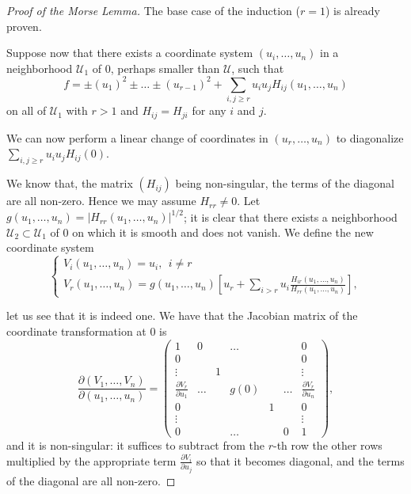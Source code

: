 \begin{proof}[Proof of the Morse Lemma]
    The base case of the induction ($r=1$) is already proven.

    Suppose now that there exists a coordinate system $(u_i,\dots,u_n)$ in a neighborhood $\mathcal{U}_1$ of $0$, perhaps smaller than $\mathcal{U}$, such that %
    \begin{equation}
        f = \pm (u_1)^2 \pm\dots\pm (u_{r-1})^2 + \sum_{i,j\ge r} u_i u_j H_{ij}(u_1,\dots,u_n)
    \label{eq1}
    \end{equation}
    on all of $\mathcal{U}_1$ with $r > 1$ and $H_{ij}=H_{ji}$ for any $i$ and $j$.

    We can now perform a linear change of coordinates in $(u_r,\dots, u_n)$ to diagonalize $\sum_{i,j\ge r} u_i u_j H_{ij}(0)$.

    We know that, the matrix $(H_{ij})$ being non-singular, the terms of the diagonal are all non-zero. Hence we may assume $H_{rr}\neq 0$. Let $g(u_1,\dots,u_n)=|H_{rr}(u_1,\dots,u_n)|^{1/2}$; it is clear that there exists a neighborhood $\mathcal{U}_2\subset \mathcal{U}_1$ of $0$ on which it is smooth and does not vanish. We define the new coordinate system
    \begin{equation}
        \begin{cases}
            V_i(u_1,\dots,u_n) = u_i,~~i\neq r\\
            V_r(u_1,\dots,u_n)=g(u_1,\dots,u_n)\left[u_r+\sum_{i>r}u_i\frac{H_{ir}(u_1,\dots,u_n)}{H_{rr}(u_1,\dots,u_n)}\right],
        \end{cases}
    \label{eq2}
    \end{equation}

    let us see that it is indeed one. We have that the Jacobian matrix of the coordinate transformation at $0$ is
    \begin{equation*}
        \frac{\partial (V_1,\dots, V_n)}{\partial (u_1,\dots, u_n)} =
        \begin{pmatrix}
            1 & 0 & ~ & \dots & ~ & ~ & 0 \\
            0 & ~ & ~ & ~ & ~ & ~ & 0 \\
            \vdots & ~ & 1 & ~ & ~ & ~ & \vdots \\
            \frac{\partial V_r}{\partial u_1} & \dots & ~ & g(0) & ~ & \dots & \frac{\partial V_r}{\partial u_n} \\
            0 & ~ & ~ & ~ & 1 & ~ & 0 \\
            \vdots & ~ & ~ & ~ & ~ & ~ & \vdots \\
            0 & ~ & ~ & \dots & ~ & 0 & 1
        \end{pmatrix},
    \end{equation*}
    and it is non-singular: it suffices to subtract from the $r$-th row the other rows multiplied by the appropriate term $\frac{\partial V_i}{\partial u_j}$ so that it becomes diagonal, and the terms of the diagonal are all non-zero.


\end{proof}
